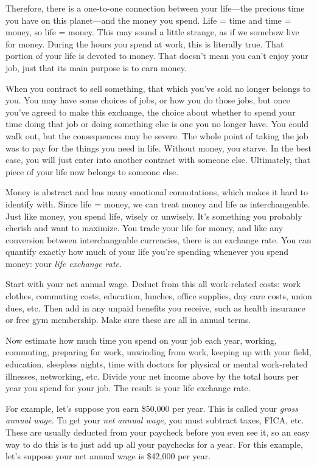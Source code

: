 Therefore, there is a one-to-one connection between your life---the precious time you have on this planet---and the money you spend. Life = time and time = money, so life = money. This may sound a little strange, as if we somehow live for money. During the hours you spend at work, this is literally true. That portion of your life is devoted to money. That doesn't mean you can't enjoy your job, just that its main purpose is to earn money.

When you contract to sell something, that which you've sold no longer belongs to you. You may have some choices of jobs, or how you do those jobs, but once you've agreed to make this exchange, the choice about whether to spend your time doing that job or doing something else is one you no longer have. You could walk out, but the consequences may be severe. The whole point of taking the job was to pay for the things you need in life. Without money, you starve. In the best case, you will just enter into another contract with someone else. Ultimately, that piece of your life now belongs to someone else.

Money is abstract and has many emotional connotations, which makes it hard to identify with. Since life = money, we can treat money and life as interchangeable. Just like money, you spend life, wisely or unwisely. It's something you probably cherish and want to maximize. You trade your life for money, and like any conversion between interchangeable currencies, there is an exchange rate. You can quantify exactly how much of your life you're spending whenever you spend money: your \emph{life exchange rate.}

Start with your net annual wage. Deduct from this all work-related costs: work clothes, commuting costs, education, lunches, office supplies, day care costs, union dues, etc. Then add in any unpaid benefits you receive, such as health insurance or free gym membership. Make sure these are all in annual terms.

Now estimate how much time you spend on your job each year, working, commuting, preparing for work, unwinding from work, keeping up with your field, education, sleepless nights, time with doctors for physical or mental work-related illnesses, networking, etc. Divide your net income above by the total hours per year you spend for your job. The result is your life exchange rate.

For example, let's suppose you earn \$50,000 per year. This is called your \emph{gross annual wage.} To get your \emph{net annual wage,} you must subtract taxes, FICA, etc. These are usually deducted from your paycheck before you even see it, so an easy way to do this is to just add up all your paychecks for a year. For this example, let's suppose your net annual wage is \$42,000 per year.

